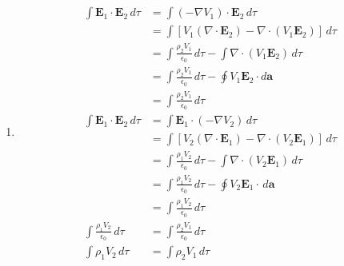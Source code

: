 \documentclass{article}
\renewcommand{\vec}[1]{\boldsymbol{\mathbf{#1}}}
\begin{document}
\setcounter{subsection}{49}
\subsection{}

\begin{enumerate}
  \item

        \begin{align*}
          \int \vec{E}_1 \cdot \vec{E}_2 \,d \tau     & = \int (-\nabla V_1) \cdot \vec{E}_2 \,d \tau                                              \\
                                                      & = \int [V_1 (\nabla \cdot \vec{E}_2) - \nabla \cdot (V_1 \vec{E}_2)] \,d \tau              \\
                                                      & = \int \frac{\rho_2 V_1}{\epsilon_0} \,d \tau - \int \nabla \cdot (V_1 \vec{E}_2) \,d \tau \\
                                                      & = \int \frac{\rho_2 V_1}{\epsilon_0} \,d \tau - \oint V_1 \vec{E}_2 \cdot d \vec{a}        \\
                                                      & = \int \frac{\rho_2 V_1}{\epsilon_0} \,d \tau                                              \\
          \int \vec{E}_1 \cdot \vec{E}_2 \,d \tau     & = \int \vec{E}_1 \cdot (-\nabla V_2) \,d \tau                                              \\
                                                      & = \int [V_2 (\nabla \cdot \vec{E}_1) - \nabla \cdot (V_2 \vec{E}_1)] \,d \tau              \\
                                                      & = \int \frac{\rho_1 V_2}{\epsilon_0} \,d \tau - \int \nabla \cdot (V_2 \vec{E}_1) \,d \tau \\
                                                      & = \int \frac{\rho_1 V_2}{\epsilon_0} \,d \tau - \oint V_2 \vec{E}_1 \cdot \,d \vec{a}      \\
                                                      & = \int \frac{\rho_1 V_2}{\epsilon_0} \,d \tau                                              \\
          \int \frac{\rho_1 V_2}{\epsilon_0} \,d \tau & = \int \frac{\rho_2 V_1}{\epsilon_0} \,d \tau                                              \\
          \int \rho_1 V_2 \,d \tau                    & = \int \rho_2 V_1 \,d \tau
        \end{align*}


\end{enumerate}
\end{document}
